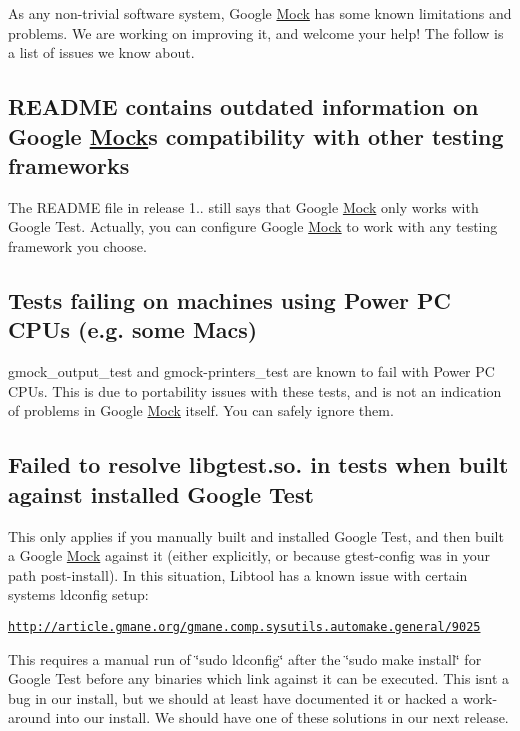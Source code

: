 As any non-\/trivial software system, Google \hyperlink{classMock}{Mock} has some known limitations and problems. We are working on improving it, and welcome your help! The follow is a list of issues we know about.

\subsection*{R\+E\+A\+D\+ME contains outdated information on Google \hyperlink{classMock}{Mock}\textquotesingle{}s compatibility with other testing frameworks}

The {\ttfamily R\+E\+A\+D\+ME} file in release 1.. still says that Google \hyperlink{classMock}{Mock} only works with Google Test. Actually, you can configure Google \hyperlink{classMock}{Mock} to work with any testing framework you choose.

\subsection*{Tests failing on machines using Power PC C\+P\+Us (e.\+g. some Macs)}

{\ttfamily gmock\+\_\+output\+\_\+test} and {\ttfamily gmock-\/printers\+\_\+test} are known to fail with Power PC C\+P\+Us. This is due to portability issues with these tests, and is not an indication of problems in Google \hyperlink{classMock}{Mock} itself. You can safely ignore them.

\subsection*{Failed to resolve libgtest.\+so. in tests when built against installed Google Test}

This only applies if you manually built and installed Google Test, and then built a Google \hyperlink{classMock}{Mock} against it (either explicitly, or because gtest-\/config was in your path post-\/install). In this situation, Libtool has a known issue with certain systems\textquotesingle{} ldconfig setup\+:

\href{http://article.gmane.org/gmane.comp.sysutils.automake.general/9025}{\tt http\+://article.\+gmane.\+org/gmane.\+comp.\+sysutils.\+automake.\+general/9025}

This requires a manual run of \char`\"{}sudo ldconfig\char`\"{} after the \char`\"{}sudo make install\char`\"{} for Google Test before any binaries which link against it can be executed. This isn\textquotesingle{}t a bug in our install, but we should at least have documented it or hacked a work-\/around into our install. We should have one of these solutions in our next release. 